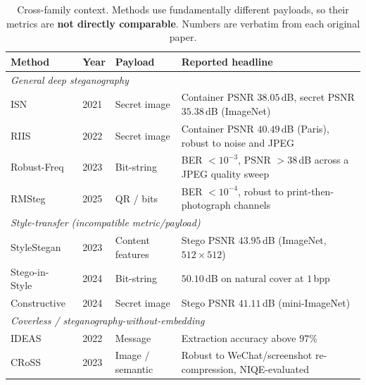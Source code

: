 \documentclass[conference]{IEEEtran}
\begin{document}
\begin{table}[t]
\centering
\caption{Cross-family context. Methods use fundamentally different payloads, so their metrics are \textbf{not directly comparable}. Numbers are verbatim from each original paper.}
\label{tab:sota_cross}
\setlength{\tabcolsep}{8pt}
\small
\begin{tabular}{llll}
\toprule
\textbf{Method} & \textbf{Year} & \textbf{Payload} & \textbf{Reported headline} \\
\midrule
\multicolumn{4}{l}{\textit{General deep steganography}} \\
ISN~\cite{isn}             & 2021 & Secret image   & Container PSNR $38.05$\,dB, secret PSNR $35.38$\,dB (ImageNet) \\
\rowcolor{rowshade}
RIIS~\cite{riis}           & 2022 & Secret image   & Container PSNR $40.49$\,dB (Paris), robust to noise and JPEG \\
Robust-Freq~\cite{rfs2023} & 2023 & Bit-string     & BER $<10^{-3}$, PSNR $>38$\,dB across a JPEG quality sweep \\
\rowcolor{rowshade}
RMSteg~\cite{rmsteg}       & 2025 & QR / bits      & BER $<10^{-4}$, robust to print-then-photograph channels \\
\midrule
\multicolumn{4}{l}{\textit{Style-transfer (incompatible metric/payload)}} \\
StyleStegan~\cite{stylestegan2023} & 2023 & Content features & Stego PSNR $43.95$\,dB (ImageNet, $512\!\times\!512$) \\
\rowcolor{rowshade}
Stego-in-Style~\cite{sst2024}  & 2024 & Bit-string    & $50.10$\,dB on natural cover at $1$\,bpp \\
Constructive~\cite{css2024}    & 2024 & Secret image  & Stego PSNR $41.11$\,dB (mini-ImageNet) \\
\midrule
\multicolumn{4}{l}{\textit{Coverless / steganography-without-embedding}} \\
IDEAS~\cite{ideas2022}     & 2022 & Message        & Extraction accuracy above $97\%$ \\
\rowcolor{rowshade}
CRoSS~\cite{cross}         & 2023 & Image / semantic & Robust to WeChat/screenshot re-compression, NIQE-evaluated \\
\bottomrule
\end{tabular}
\end{table}
\end{document}
